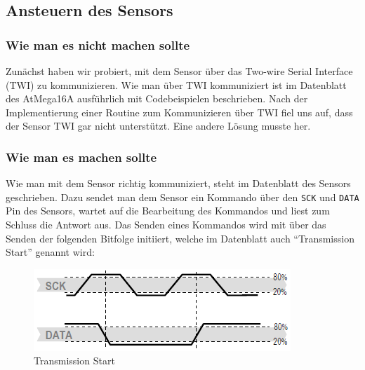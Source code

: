 \documentclass[]{article}
\begin{document}
\subsection{Ansteuern des Sensors}
\subsubsection{Wie man es nicht machen sollte}
Zunächst haben wir probiert, mit dem Sensor über das Two-wire Serial Interface (TWI) zu kommunizieren. Wie man über TWI kommuniziert ist im Datenblatt des AtMega16A ausführlich mit Codebeispielen beschrieben. Nach der Implementierung einer Routine zum Kommunizieren über TWI fiel uns auf, dass der Sensor TWI gar nicht unterstützt. Eine andere Lösung musste her.
\subsubsection{Wie man es machen sollte}
Wie man mit dem Sensor richtig kommuniziert, steht im Datenblatt des Sensors geschrieben. Dazu sendet man dem Sensor ein Kommando über den \texttt{SCK} und \texttt{DATA} Pin des Sensors, wartet auf die Bearbeitung des Kommandos und liest zum Schluss die Antwort aus. 
Das Senden eines Kommandos wird mit über das Senden der folgenden Bitfolge initiiert, welche im Datenblatt auch "`Transmission Start"' genannt wird: 
\begin{figure}[h]
	\centering
	\includegraphics[width=0.5\columnwidth]{transmission_start.png}
	\caption{Transmission Start}
\end{figure}
\end{document}
